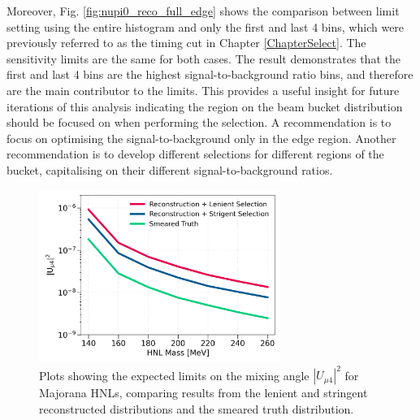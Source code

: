 Moreover, Fig. \ref{fig:nupi0_reco_full_edge} shows the comparison between limit setting using the entire histogram and only the first and last 4 bins, which were previously referred to as the timing cut in Chapter \ref{ChapterSelect}. 
The sensitivity limits are the same for both cases.
The result demonstrates that the first and last 4 bins are the highest signal-to-background ratio bins, and therefore are the main contributor to the limits.
This provides a useful insight for future iterations of this analysis indicating the region on the beam bucket distribution should be focused on when performing the selection.
A recommendation is to focus on optimising the signal-to-background only in the edge region.
Another recommendation is to develop different selections for different regions of the bucket, capitalising on their different signal-to-background ratios.

\begin{figure}[b!]
    \centering
    \includegraphics[width=0.7\textwidth]{sensitivity_strict_loose_truth}
    \caption{Plots showing the expected limits on the mixing angle $|U_{\mu4}|^2$ for Majorana HNLs, comparing results from the lenient and stringent reconstructed distributions and the smeared truth distribution.}
    \label{fig:nupi0_reco_truth}
\end{figure}

